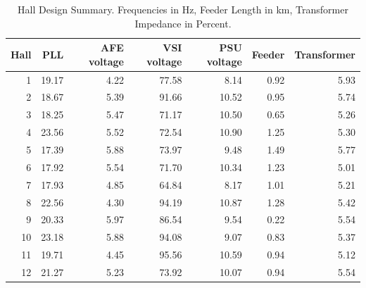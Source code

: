 \begin{table}[H]
\centering\small
\caption{Hall Design Summary.
Frequencies in Hz, Feeder Length in km, Transformer Impedance in Percent.}
\label{tab:hall-design}
\begin{tabular}{rrrrrrr}\toprule
Hall & PLL & AFE voltage & VSI voltage & PSU voltage & Feeder & Transformer\\\midrule
1 & 19.17 & 4.22 & 77.58 & 8.14 & 0.92 & 5.93 \\
2 & 18.67 & 5.39 & 91.66 & 10.52 & 0.95 & 5.74 \\
3 & 18.25 & 5.47 & 71.17 & 10.50 & 0.65 & 5.26 \\
4 & 23.56 & 5.52 & 72.54 & 10.90 & 1.25 & 5.30 \\
5 & 17.39 & 5.88 & 73.97 & 9.48 & 1.49 & 5.77 \\
6 & 17.92 & 5.54 & 71.70 & 10.34 & 1.23 & 5.01 \\
7 & 17.93 & 4.85 & 64.84 & 8.17 & 1.01 & 5.21 \\
8 & 22.56 & 4.30 & 94.19 & 10.87 & 1.28 & 5.42 \\
9 & 20.33 & 5.97 & 86.54 & 9.54 & 0.22 & 5.54 \\
10 & 23.18 & 5.88 & 94.08 & 9.07 & 0.83 & 5.37 \\
11 & 19.71 & 4.45 & 95.56 & 10.59 & 0.94 & 5.12 \\
12 & 21.27 & 5.23 & 73.92 & 10.07 & 0.94 & 5.54 \\
\bottomrule\end{tabular}\end{table}
